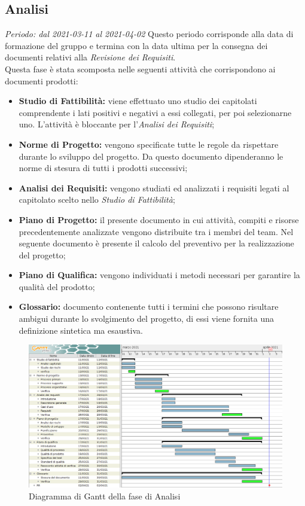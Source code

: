 \subsection{Analisi}
\textit{Periodo: dal 2021-03-11 al 2021-04-02}
Questo periodo corrisponde alla data di formazione del gruppo e termina con la data ultima per la consegna dei documenti relativi alla \textit{Revisione dei Requisiti}.\\
Questa fase è stata scomposta nelle seguenti attività che corrispondono ai documenti prodotti:
\begin {itemize}
\item \textbf{Studio di Fattibilità:} viene effettuato uno studio dei capitolati comprendente i lati positivi e negativi a essi collegati, per poi selezionarne uno. L'attività è bloccante per l'\textit{Analisi dei Requisiti};
\item \textbf{Norme di Progetto:} vengono specificate tutte le regole da rispettare durante lo sviluppo del progetto. Da questo documento dipenderanno le norme di stesura di tutti i prodotti successivi;
\item \textbf{Analisi dei Requisiti:} vengono studiati ed analizzati i requisiti legati al capitolato scelto nello \textit{Studio di Fattibilità};
\item \textbf{Piano di Progetto:} il presente documento in cui attività, compiti e risorse precedentemente analizzate vengono distribuite tra i membri del team. Nel seguente documento è presente il calcolo del preventivo per la realizzazione del progetto;
\item \textbf{Piano di Qualifica:} vengono individuati i metodi necessari per garantire la qualità del prodotto;
\item \textbf{Glossario:} documento contenente tutti i termini che possono risultare ambigui durante lo svolgimento del progetto, di essi viene fornita una definizione sintetica ma esaustiva.
\end {itemize}
\begin{figure}[!ht]
    \caption{Diagramma di Gantt della fase di Analisi}
    \vspace{5px}
    \includegraphics[scale=0.21]{../../../Images/Diagrammi/Gantt/diagramma_gantt_analisi_0.2.png}
    \centering
\end{figure}

